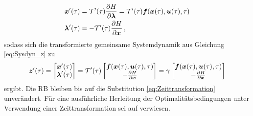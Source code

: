 \begin{align}
\boldsymbol{x}'(\tau) &= \mathcal{T}'(\tau)\frac{\partial H}{\partial\boldsymbol{\lambda}} = \mathcal{T}'(\tau)\boldsymbol{f}(\boldsymbol{x}(\tau),\boldsymbol{u}(\tau),\tau) \label{eq:Zustandsdgl_tau} \\
\boldsymbol{\lambda}'(\tau) &= -\mathcal{T}'(\tau)\frac{\partial H}{\partial \boldsymbol{x}}\,, \label{eq:Adjdgl_tau} \\
\end{align}
sodass sich die transformierte gemeinsame Systemdynamik aus Gleichung \ref{eq:Sysdyn_z} zu 
\begin{equation}
	\boldsymbol{z}'(\tau) = \begin{bmatrix}
	\boldsymbol{x}'(\tau) \\
	\boldsymbol{\lambda}'(\tau)
	\end{bmatrix} = \mathcal{T}'(\tau)
	\begin{bmatrix}
	\boldsymbol{f}(\boldsymbol{x}(\tau),\boldsymbol{u}(\tau),\tau) \\
	-\frac{\partial H}{\partial \boldsymbol{x}}
	\end{bmatrix} = 
	\gamma
	\begin{bmatrix}
	\boldsymbol{f}(\boldsymbol{x}(\tau),\boldsymbol{u}(\tau),\tau) \\
	-\frac{\partial H}{\partial \boldsymbol{x}}
	\end{bmatrix} \label{eq:Sysdyn_z_tau}
\end{equation} 
ergibt. Die \gls{RB} bleiben bis auf die Substitution \ref{eq:Zeittransformation} unverändert. Für eine ausführliche Herleitung der Optimalitätsbedingungen unter Verwendung einer Zeittransformation sei auf \cite{Gerdts.2010} verwiesen.

